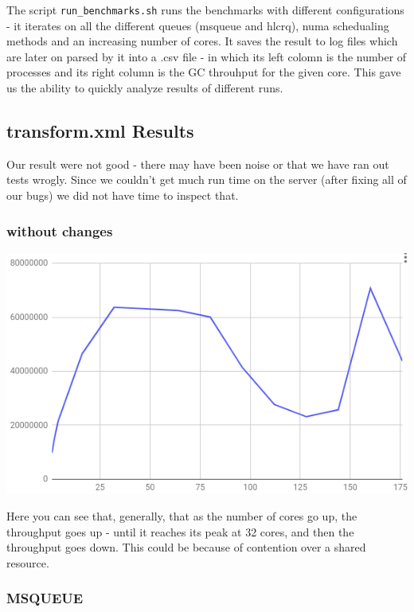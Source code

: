 \documentclass{article}
\begin{document}
 The script \texttt{run\_benchmarks.sh} runs the benchmarks with different configurations - it iterates on all the different queues (msqueue and hlcrq), numa schedualing methods and an increasing number of cores. It saves the result to log files which are later on parsed by it into a .csv file - in which its left colomn is the number of processes and its right column is the GC throuhput for the given core.
This gave us the ability to quickly analyze results of different runs.

 \newpage

 \subsection{transform.xml Results}
 Our result were not good - there may have been noise or that we have ran out tests wrogly. Since we couldn't get much run time on the server (after fixing all of our bugs) we did not have time to inspect that.

 \subsubsection{without changes}

 \includegraphics[width=\textwidth]{graph-no-changes.png}

 Here you can see that, generally, that as the number of cores go up, the throughput goes up - until it reaches its peak at 32 cores, and then the throughput goes down. This could be because of contention over a shared resource.
 

 \subsubsection{MSQUEUE}
\end{document}
